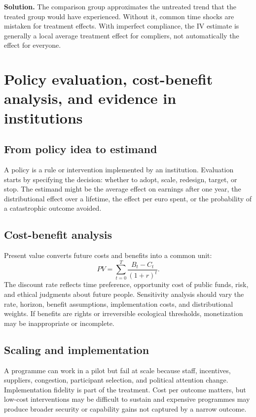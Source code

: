 \documentclass[11pt,oneside,openany]{book}
\newcommand{\solution}[1]{\textbf{Solution.} #1}
\begin{document}
\solution{The comparison group approximates the untreated trend that the treated group would have experienced. Without it, common time shocks are mistaken for treatment effects. With imperfect compliance, the IV estimate is generally a local average treatment effect for compliers, not automatically the effect for everyone.}

\chapter{Policy evaluation, cost-benefit analysis, and evidence in institutions}
\label{ch:evaluation}

\section{From policy idea to estimand}

A policy is a rule or intervention implemented by an institution. Evaluation starts by specifying the decision: whether to adopt, scale, redesign, target, or stop. The estimand might be the average effect on earnings after one year, the distributional effect over a lifetime, the effect per euro spent, or the probability of a catastrophic outcome avoided.

\section{Cost-benefit analysis}

Present value converts future costs and benefits into a common unit:
\[
  PV=\sum_{t=0}^{T}\frac{B_t-C_t}{(1+r)^t}.
\]
The discount rate reflects time preference, opportunity cost of public funds, risk, and ethical judgments about future people. Sensitivity analysis should vary the rate, horizon, benefit assumptions, implementation costs, and distributional weights. If benefits are rights or irreversible ecological thresholds, monetization may be inappropriate or incomplete.

\section{Scaling and implementation}

A programme can work in a pilot but fail at scale because staff, incentives, suppliers, congestion, participant selection, and political attention change. Implementation fidelity is part of the treatment. Cost per outcome matters, but low-cost interventions may be difficult to sustain and expensive programmes may produce broader security or capability gains not captured by a narrow outcome.
\end{document}
